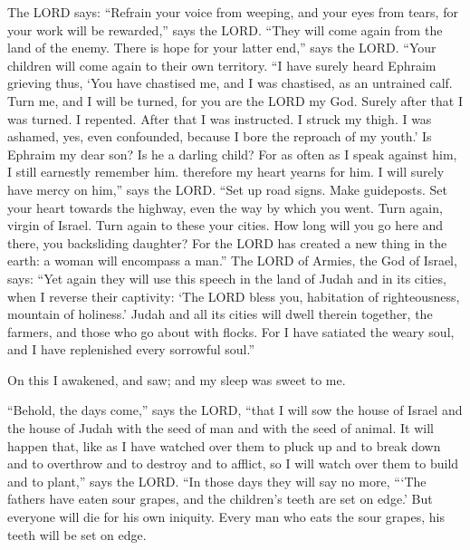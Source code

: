  The LORD says: ``Refrain your voice from weeping, and your
eyes from tears, for your work will be rewarded,'' says the LORD. ``They
will come again from the land of the enemy.  There is hope
for your latter end,'' says the LORD. ``Your children will come again to
their own territory.  ``I have surely heard Ephraim
grieving thus, `You have chastised me, and I was chastised, as an
untrained calf. Turn me, and I will be turned, for you are the LORD my
God.  Surely after that I was turned. I repented. After
that I was instructed. I struck my thigh. I was ashamed, yes, even
confounded, because I bore the reproach of my youth.'  Is
Ephraim my dear son? Is he a darling child? For as often as I speak
against him, I still earnestly remember him. therefore my heart yearns
for him. I will surely have mercy on him,'' says the LORD. 
``Set up road signs. Make guideposts. Set your heart towards the
highway, even the way by which you went. Turn again, virgin of Israel.
Turn again to these your cities.  How long will you go here
and there, you backsliding daughter? For the LORD has created a new
thing in the earth: a woman will encompass a man.''  The
LORD of Armies, the God of Israel, says: ``Yet again they will use this
speech in the land of Judah and in its cities, when I reverse their
captivity: `The LORD bless you, habitation of righteousness, mountain of
holiness.'  Judah and all its cities will dwell therein
together, the farmers, and those who go about with flocks. 
For I have satiated the weary soul, and I have replenished every
sorrowful soul.''

 On this I awakened, and saw; and my sleep was sweet to me.

 ``Behold, the days come,'' says the LORD, ``that I will
sow the house of Israel and the house of Judah with the seed of man and
with the seed of animal.  It will happen that, like as I
have watched over them to pluck up and to break down and to overthrow
and to destroy and to afflict, so I will watch over them to build and to
plant,'' says the LORD.  ``In those days they will say no
more, ```The fathers have eaten sour grapes, and the children's teeth
are set on edge.'  But everyone will die for his own
iniquity. Every man who eats the sour grapes, his teeth will be set on
edge.

